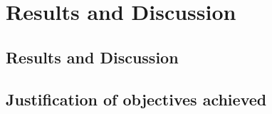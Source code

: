 \chapter{Results and Discussion}
        \section{Results and Discussion}
        \section{Justification of objectives achieved}
   